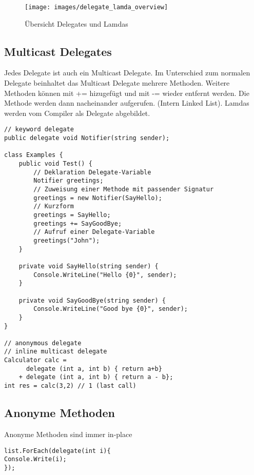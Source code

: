 \begin{figure}[h]
	\centering
	\texttt{[image: images/delegate\_lamda\_overview]}
	\caption{Übersicht Delegates und Lamdas}
	\label{fig:delegatelamdaoverview}
\end{figure}

\clearpage

\subsection{Multicast Delegates}
Jedes Delegate ist auch ein Multicast Delegate. Im Unterschied zum normalen Delegate beinhaltet das Multicast Delegate mehrere Methoden. Weitere Methoden können mit += hizugefügt und mit -= wieder entfernt werden. Die Methode werden dann nacheinander aufgerufen. (Intern Linked List). Lamdas werden vom Compiler als Delegate abgebildet.
\begin{lstlisting}
// keyword delegate
public delegate void Notifier(string sender);

class Examples {
	public void Test() {
		// Deklaration Delegate-Variable
		Notifier greetings; 
		// Zuweisung einer Methode mit passender Signatur
		greetings = new Notifier(SayHello); 
		// Kurzform
		greetings = SayHello;
		greetings += SayGoodBye;
		// Aufruf einer Delegate-Variable
		greetings("John");
	}

	private void SayHello(string sender) {
		Console.WriteLine("Hello {0}", sender);
	}
	
	private void SayGoodBye(string sender) {
		Console.WriteLine("Good bye {0}", sender);
	}
} 

// anonymous delegate
// inline multicast delegate
Calculator calc =  
	  delegate (int a, int b) { return a+b}
	+ delegate (int a, int b) { return a - b};
int res = calc(3,2) // 1 (last call)
\end{lstlisting}

\subsection{Anonyme Methoden}
Anonyme Methoden sind immer in-place
\begin{lstlisting}
list.ForEach(delegate(int i){
Console.Write(i);
});
\end{lstlisting}

\clearpage

